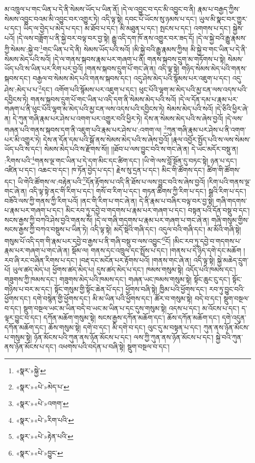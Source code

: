 མ་འཁྲུལ་པ་གང་ཡིན་པ་དེ་ནི་སེམས་ཡོད་པ་ཡིན་ནོ། །དེ་ལ་འབྱུང་བ་དང་མི་འབྱུང་བ་ནི། རྣམ་པ་བརྒྱད་ཀྱིས་སེམས་འབྱུང་བའམ་མི་འབྱུང་བར་འགྱུར་ཏེ། འདི་ལྟ་སྟེ། དབང་པོ་ཡོངས་སུ་ཉམས་པ་དང་། ཡུལ་མི་སྣང་བར་གྱུར་པ་དང་། ཡིད་ལ་བྱེད་པ་མེད་པ་དང་། མ་ཐོབ་པ་དང་། མི་མཐུན་པ་དང་། སྤངས་པ་དང་། འགགས་པ་དང་། སྐྱེས་པའོ། །དེ་ལས་བཟློག་པ་ནི་སྐྱེ་བར་བལྟ་བར་བྱ་སྟེ། རྒྱུ་འདི་དག་ཁོ་ནས་འགྱུར་བར་ཟད་དོ། །དེ་ལ་སྐྱེ་བའི་རྒྱུ་རྣམས་ཀྱི་སེམས་:སྐྱེ་བ་\footnote{«སྣར་»སྐྱེ་}གང་ཡིན་པ་དེ་ནི། སེམས་ཡོད་པའི་སའོ། །མི་སྐྱེ་བའི་རྒྱུ་རྣམས་ཀྱིས། མི་སྐྱེ་བ་གང་ཡིན་པ་དེ་ནི་སེམས་མེད་པའི་སའོ། །དེ་ལ་གནས་སྐབས་རྣམ་པར་གཞག་པ་ནི། གནས་སྐབས་དྲུག་མ་གཏོགས་པ་སྟེ། སེམས་ཡོད་པའི་ས་ཡིན་པར་རིག་པར་བྱའོ། །གནས་སྐབས་དྲུག་པོ་གང་ཞེ་ན། འདི་ལྟ་སྟེ། གཉིད་སེམས་མེད་པའི་གནས་སྐབས་དང་། བརྒྱལ་བ་སེམས་མེད་པའི་གནས་སྐབས་དང་། འདུ་ཤེས་མེད་པའི་སྙོམས་པར་འཇུག་པ་དང་། འདུ་ཤེས་:མེད་པ་པ་\footnote{«སྣར་»«པེ་»མེད་པ་}དང་། འགོག་པའི་སྙོམས་པར་འཇུག་པ་དང་། ཕུང་པོའི་ལྷག་མ་མེད་པའི་མྱ་ངན་ལས་འདས་པའི་དབྱིངས་ཏེ། གནས་སྐབས་དྲུག་པོ་གང་ཡིན་པ་འདི་དག་ནི་སེམས་མེད་པའི་སའོ། །དེ་ལ་དོན་དམ་པ་རྣམ་པར་གཞག་པ་ནི་ཕུང་པོའི་ལྷག་མ་མེད་པའི་མྱ་ངན་ལས་འདས་པའི་དབྱིངས་ཏེ། སེམས་མེད་པའི་སའོ། །དེ་ཅིའི་ཕྱིར་ཞེ་ན། དེ་ཀུན་གཞི་རྣམ་པར་ཤེས་པ་འགག་པར་འགྱུར་བའི་ཕྱིར་ཏེ། དེས་ན་སེམས་མེད་པའི་ས་ཞེས་བྱའོ། །དེ་ལས་གཞན་པའི་གནས་སྐབས་དག་ནི་འཇུག་པའི་རྣམ་པར་ཤེས་པ་:འགག་ལ། \footnote{«སྣར་»«པེ་»འགག་}ཀུན་གཞི་རྣམ་པར་ཤེས་པ་ནི་འགག་པར་མི་འགྱུར་ཏེ། དེས་ན་དོན་དམ་པའི་སྒོ་ནས་སེམས་མེད་པའི་ས་ཞེས་བྱའོ། །རྣལ་འབྱོར་སྤྱོད་པའི་ས་ལས་སེམས་ཡོད་པའི་ས་དང་། སེམས་མེད་པའི་ས་རྫོགས་སོ།། །།ཐོབ་པ་ལས་བྱུང་བའི་ས་གང་ཞེ་ན། དེ་ཡང་མདོར་བསྡུ་ན། :རིགས་པའི་\footnote{«སྣར་»«པེ་»རིག་པའི་}གནས་ལྔ་གང་ཡིན་པ་དེ་དག་མིང་དང་ཚིག་དང་། །ཡི་གེ་ལས་བློ་སྔོན་དུ་བཏང་སྟེ། ཉན་པ་དང་། འཛིན་པ་དང་། འཆང་བ་དང་། ཁ་ཏོན་བྱེད་པ་དང་། རྗེས་སུ་དྲན་པ་དང་། མིང་གི་ཚོགས་དང་། ཚིག་གི་ཚོགས་དང་། ཡི་གེའི་ཚོགས་ལ་:བརྟེན་པའི་\footnote{«སྣར་»«པེ་»རྟེན་པའི་}དོན་རྟོགས་པ་འདི་ནི་ཐོས་པ་ལས་བྱུང་བའི་ས་ཞེས་བྱའོ། །རིག་པའི་གནས་ལྔ་གང་ཞེ་ན། འདི་ལྟ་སྟེ་ནང་གི་རིག་པ་དང་། གསོ་བ་རིག་པ་དང་། གཏན་ཚིགས་ཀྱི་རིག་པ་དང་། སྒྲའི་རིག་པ་དང་། བཟོའི་ལས་ཀྱི་གནས་ཀྱི་རིག་པའོ། །ནང་གི་རིག་པ་གང་ཞེ་ན། དེ་ནི་རྣམ་པ་བཞིར་བལྟ་བར་བྱ་སྟེ། གཞི་གདགས་པ་རྣམ་པར་གཞག་པ་དང་། མིང་རབ་ཏུ་དབྱེ་བ་གདགས་པ་རྣམ་པར་གཞག་པ་དང་། བསྟན་པའི་དོན་བསྡུ་བ་དང་། སངས་རྒྱས་ཀྱི་བཀའི་ཤེས་བྱའི་གནས་སོ། །དེ་ལ་གཞི་གདགས་པ་རྣམ་པར་གཞག་པ་གང་ཞེ་ན། གཞི་གསུམ་གྱིས་སངས་རྒྱས་ཀྱི་བཀའ་བསྡུས་པ་ཡིན་ཏེ། འདི་ལྟ་སྟེ། མདོ་སྡེའི་གཞི་དང་། འདུལ་བའི་གཞི་དང་། མ་མོའི་གཞི་སྟེ། གསུམ་པོ་འདི་དག་གི་རྣམ་པར་དབྱེ་བ་རྒྱས་པ་ནི་གཞི་བསྡུ་བ་ལས་འབྱུང་\footnote{«སྣར་»«པེ་»བྱུང་}ངོ། །མིང་རབ་ཏུ་དབྱེ་བ་གདགས་པ་རྣམ་པར་གཞག་པ་གང་ཞེ་ན། སྡོམ་ལ། གནས་དང་འཁྲུལ་དང་སྤྲོས་པ་དང་། །གནས་པ་དེ་ཉིད་དགེ་དང་མཆོག །རབ་ཞི་རང་བཞིན་རིགས་པ་དང་། །བརྡ་དང་མངོན་པར་རྟོགས་པའོ། །གནས་གང་ཞེ་ན། འདི་ལྟ་སྟེ། སྐྱེ་མཆེད་དྲུག་པོ། ཡུལ་ཚད་མེད་པ། ཕྱོགས་ཚད་མེད་པ། དུས་ཚད་མེད་པ་དང་། ཁམས་གསུམ་སྟེ། འདོད་པའི་ཁམས་དང་། གཟུགས་ཀྱི་ཁམས་དང་། གཟུགས་མེད་པའི་ཁམས་དང་། གཞན་ཡང་ཁམས་གསུམ་སྟེ། སྟོང་ཆུང་ངུ་དང་། སྟོང་གཉིས་པ་བར་མ་དང་། སྟོང་གསུམ་གྱི་སྟོང་ཆེན་པོ་དང་། ཕྱོགས་བཞི་སྟེ། ཁྱིམ་པའི་ཕྱོགས་དང་། རབ་ཏུ་བྱུང་བའི་ཕྱོགས་དང་། དགེ་བསྙེན་གྱི་ཕྱོགས་དང་། མི་མ་ཡིན་པའི་ཕྱོགས་དང་། ཚོར་བ་གསུམ་སྟེ། བདེ་བ་དང་། སྡུག་བསྔལ་བ་དང་། སྡུག་བསྔལ་ཡང་མ་ཡིན་བདེ་བ་ཡང་མ་ཡིན་པ་དང་དུས་གསུམ་སྟེ། འདས་པ་དང་། མ་འོངས་པ་དང་། ད་ལྟར་བྱུང་བ་དང་། དཀོན་མཆོག་གསུམ་སྟེ། སངས་རྒྱས་དཀོན་མཆོག་དང་། ཆོས་དཀོན་མཆོག་དང་། དགེ་འདུན་དཀོན་མཆོག་དང་། ཆོས་གསུམ་སྟེ། དགེ་བ་དང་། མི་དགེ་བ་དང་། ལུང་དུ་མ་བསྟན་པ་དང་། ཀུན་ནས་ཉོན་མོངས་པ་གསུམ་སྟེ། ཉོན་མོངས་པའི་ཀུན་ནས་ཉོན་མོངས་པ་དང་། ལས་ཀྱི་ཀུན་ནས་ཉོན་མོངས་པ་དང་། སྐྱེ་བའི་ཀུན་ནས་ཉོན་མོངས་པ་དང་། འཕགས་པའི་བདེན་པ་བཞི་སྟེ། སྡུག་བསྔལ་བ་དང་། 